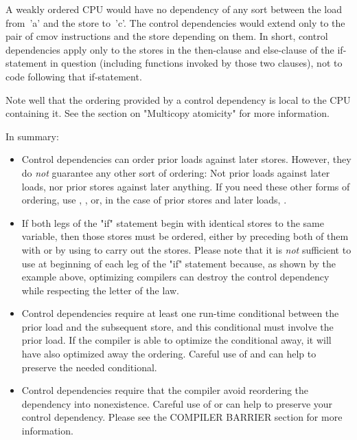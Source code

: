 A weakly ordered CPU would have no dependency of any sort between the load
from~'a' and the store to~'c'.
The control dependencies would extend only to the pair of cmov
instructions and the store depending on them.
In short, control dependencies apply only to the stores in the then-clause
and else-clause of the if-statement in question (including functions
invoked by those two clauses), not to code following that if-statement.


Note well that the ordering provided by a control dependency is local
to the CPU containing it.
See the section on "Multicopy atomicity" for more information.


In summary:

\begin{itemize}
 \item
      Control dependencies can order prior loads against later stores.
      However, they do \emph{not} guarantee any other sort of ordering:
      Not prior loads against later loads, nor prior stores against
      later anything.
      If you need these other forms of ordering, use ,
      , or, in the case of prior stores and later loads,
      .

 \item
      If both legs of the "if" statement begin with identical stores to
      the same variable, then those stores must be ordered, either by
      preceding both of them with  or by using
       to carry out the stores.
      Please note that it is \emph{not} sufficient to use 
      at beginning of each leg of the "if" statement because, as shown by
      the example above, optimizing compilers can destroy the control
      dependency while respecting the letter of the  law.

 \item
      Control dependencies require at least one run-time conditional
      between the prior load and the subsequent store, and this
      conditional must involve the prior load.
      If the compiler is able to optimize the conditional away, it will
      have also optimized away the ordering.
      Careful use of  and  can help to
      preserve the needed conditional.

 \item
      Control dependencies require that the compiler avoid reordering the
      dependency into nonexistence.
      Careful use of  or  can help
      to preserve your control dependency.
      Please see the COMPILER BARRIER section for more information.


\end{itemize}
